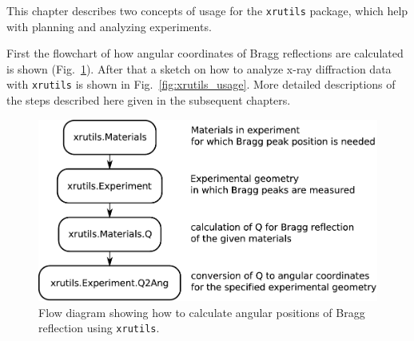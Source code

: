 %
%
%
%


This chapter describes two concepts of usage for the {\tt xrutils} package, which help with planning and analyzing experiments.

First the flowchart of how angular coordinates of Bragg reflections are calculated is shown (Fig.~\ref{fig:xrutils_usage_planning}). After that a sketch on how to analyze x-ray diffraction data with {\tt xrutils} is shown in Fig.~\ref{fig:xrutils_usage}. More detailed descriptions of the steps described here given in the subsequent chapters.

\begin{figure}[H]
 \centering
 \includegraphics[width=0.8\linewidth]{pics/xrutils_usage_planning}
 \caption{Flow diagram showing how to calculate angular positions of Bragg reflection using {\tt xrutils}.}
 \label{fig:xrutils_usage_planning}
\end{figure}
   
